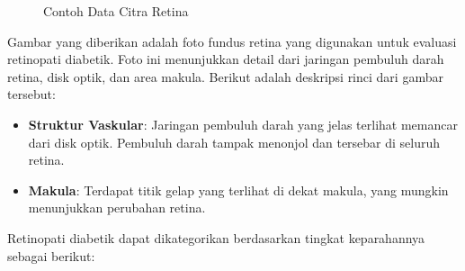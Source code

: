 	\begin{figure}[hbtp]
		\centering
		\caption{Contoh Data Citra Retina}
		\label{fig:sampleDataset}
	\end{figure}
Gambar yang diberikan adalah foto fundus retina yang digunakan untuk evaluasi retinopati diabetik. Foto ini menunjukkan detail dari jaringan pembuluh darah retina, disk optik, dan area makula. Berikut adalah deskripsi rinci dari gambar tersebut:
	\begin{itemize}
		\item \textbf{Struktur Vaskular}: Jaringan pembuluh darah yang jelas terlihat memancar dari disk optik. Pembuluh darah tampak menonjol dan tersebar di seluruh retina.
		\item \textbf{Makula}: Terdapat titik gelap yang terlihat di dekat makula, yang mungkin menunjukkan perubahan retina.
	\end{itemize}
Retinopati diabetik dapat dikategorikan berdasarkan tingkat keparahannya sebagai berikut:

